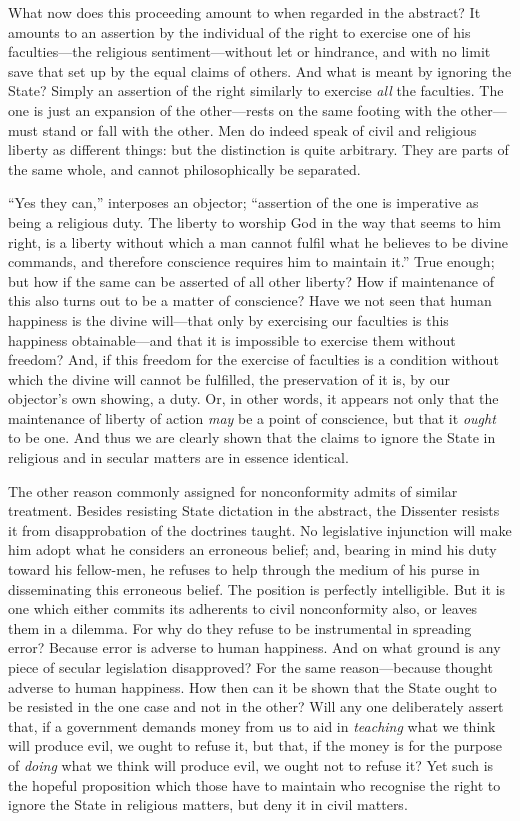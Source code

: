 \documentclass[oneside]{book}
\begin{document}
What now does this proceeding amount to when regarded
in the abstract? It amounts to an assertion by the individual
of the right to exercise one of his faculties---the religious
sentiment---without let or hindrance, and with no limit save
that set up by the equal claims of others. And what is meant
by ignoring the State? Simply an assertion of the right similarly
to exercise \textit{all} the faculties. The one is just an expansion
of the other---rests on the same footing with the other---must
stand or fall with the other. Men do indeed speak of civil
and religious liberty as different things: but the distinction
is quite arbitrary. They are parts of the same whole, and
cannot philosophically be separated.

``Yes they can,'' interposes an objector; ``assertion of the
one is imperative as being a religious duty. The liberty to
worship God in the way that seems to him right, is a liberty
without which a man cannot fulfil what he believes to be
divine commands, and therefore conscience requires him to
maintain it.'' True enough; but how if the same can be
asserted of all other liberty? How if maintenance of this also
turns out to be a matter of conscience? Have we not seen
that human happiness is the divine will---that only by exercising
our faculties is this happiness obtainable---and that it is impossible
to exercise them without freedom? And, if this freedom
for the exercise of faculties is a condition without which the
\newpage\noindent
divine will cannot be fulfilled, the preservation of it is, by our
objector's own showing, a duty. Or, in other words, it appears
not only that the maintenance of liberty of action \textit{may} be a
point of conscience, but that it \textit{ought} to be one. And thus we
are clearly shown that the claims to ignore the State in religious
and in secular matters are in essence identical.

The other reason commonly assigned for nonconformity
admits of similar treatment. Besides resisting State dictation
in the abstract, the Dissenter resists it from disapprobation of
the doctrines taught. No legislative injunction will make him
adopt what he considers an erroneous belief; and, bearing in
mind his duty toward his fellow-men, he refuses to help through
the medium of his purse in disseminating this erroneous belief.
The position is perfectly intelligible. But it is one which
either commits its adherents to civil nonconformity also, or
leaves them in a dilemma. For why do they refuse to be
instrumental in spreading error? Because error is adverse to
human happiness. And on what ground is any piece of secular
legislation disapproved? For the same reason---because thought
adverse to human happiness. How then can it be shown that
the State ought to be resisted in the one case and not in the
other? Will any one deliberately assert that, if a government
demands money from us to aid in \textit{teaching} what we think will
produce evil, we ought to refuse it, but that, if the money is for
the purpose of \textit{doing} what we think will produce evil, we ought
not to refuse it? Yet such is the hopeful proposition which
those have to maintain who recognise the right to ignore the
State in religious matters, but deny it in civil matters.
\end{document}
